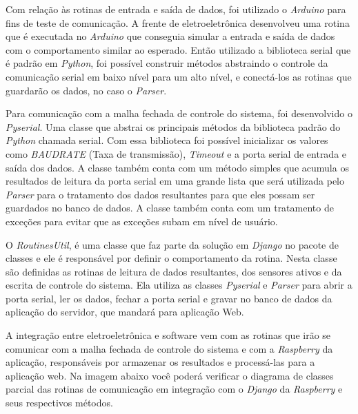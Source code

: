 Com relação às rotinas de entrada e saída de dados, foi utilizado o \textit{Arduino} para fins de teste de comunicação. A frente de eletroeletrônica 
desenvolveu uma rotina que é executada no \textit{Arduino} que conseguia simular a entrada e saída de dados com o comportamento similar ao esperado. 
Então utilizado a biblioteca serial que é padrão em \textit{Python}, foi possível construir métodos abstraindo o controle da comunicação serial em baixo
nível para um alto nível, e conectá-los as rotinas que guardarão os dados, no caso o \textit{Parser}.

Para comunicação com a malha fechada de controle do sistema, foi desenvolvido o \textit{Pyserial}. Uma classe que abstrai os principais métodos da 
biblioteca padrão do \textit{Python} chamada serial. Com essa biblioteca foi possível inicializar os valores como \textit{BAUDRATE} (Taxa de transmissão),
\textit{Timeout} e a porta serial de entrada e saída dos dados. A classe também conta com um método simples que acumula os resultados de leitura da porta 
serial em uma grande lista que será utilizada pelo \textit{Parser} para o tratamento dos dados resultantes para que eles possam ser guardados no banco de 
dados. A classe também conta com um tratamento de exceções para evitar que as exceções subam em nível de usuário.

O \textit{RoutinesUtil}, é uma classe que faz parte da solução em \textit{Django} no pacote de classes e ele é responsável por definir o comportamento 
da rotina. Nesta classe são definidas as rotinas de leitura de dados resultantes, dos sensores ativos e da escrita de controle do sistema. Ela utiliza 
as classes \textit{Pyserial} e \textit{Parser} para abrir a porta serial, ler os dados, fechar a porta serial e gravar no banco de dados da aplicação do 
servidor, que mandará para aplicação Web.

A integração entre eletroeletrônica e software vem com as rotinas que irão se comunicar com a malha fechada de controle do sistema e com a 
\textit{Raspberry} da aplicação, responsáveis por armazenar os resultados e processá-las para a aplicação web. Na imagem abaixo você poderá verificar 
o diagrama de classes parcial das rotinas de comunicação em integração com o \textit{Django} da \textit{Raspberry} e seus respectivos métodos.

